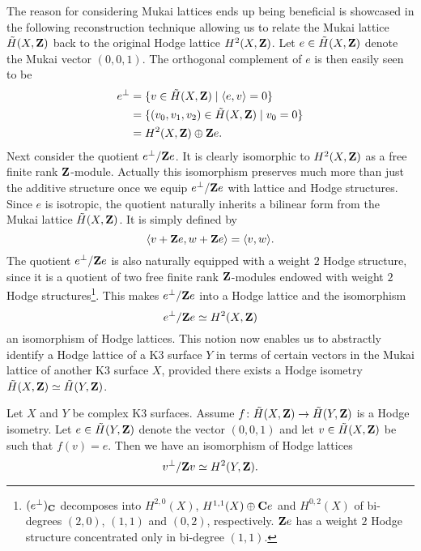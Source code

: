 The reason for considering Mukai lattices ends up being beneficial is showcased in the following reconstruction technique allowing us to relate the Mukai lattice $\,\tilde{\!{H}}(X, \mathbf Z)$ back to the original Hodge lattice $H^{2}(X, \mathbf Z)$.
Let $e \in \,\tilde{\!{H}}(X, \mathbf Z)$ denote the Mukai vector $(0,0,1)$.
The orthogonal complement of $e$ is then easily seen to be
\begin{align*}
    e^\perp &= \{ v \in \,\tilde{\!{H}}(X, \mathbf Z) \mid \langle e, v \rangle = 0\} \\
    &= \{(v_0, v_1, v_2) \in \,\tilde{\!{H}}(X, \mathbf Z) \mid v_0 = 0\} \\
    &= H^{2}(X, \mathbf Z) \oplus \mathbf Z e.
\end{align*}
Next consider the quotient $e^\perp / \mathbf Z e$. It is clearly isomorphic to $H^{2}(X, \mathbf Z)$ as a free finite rank $\mathbf Z$-module. Actually this isomorphism preserves much more than just the additive structure once we equip ${e}^\perp / \mathbf Z{e}$ with lattice and Hodge structures. Since $e$ is isotropic, the quotient naturally inherits a bilinear form from the Mukai lattice $\,\tilde{\!{H}}(X, \mathbf Z)$. It is simply defined by
\[
    \langle v + \mathbf Z e, w + \mathbf Z e \rangle = \langle v, w \rangle.
\]
The quotient ${e}^\perp / \mathbf Z{e}$ is also naturally equipped with a weight $2$ Hodge structure, since it is a quotient of two free finite rank $\mathbf Z$-modules endowed with weight $2$ Hodge structures\footnote{
    $(e^\perp)_\mathbf C$ decomposes into $H^{2,0}(X)$, $H^{1,1}(X) \oplus \mathbf C e$ and $H^{0,2}(X)$ of bi-degrees $(2,0)$, $(1,1)$ and $(0,2)$, respectively. $\mathbf Z e$ has a weight $2$ Hodge structure concentrated only in bi-degree $(1,1)$.
}. This makes ${e}^\perp / \mathbf Z{e}$ into a Hodge lattice and the isomorphism
\[
    {e}^\perp / \mathbf Z{e} \simeq H^{2}(X, \mathbf Z)
\]
an isomorphism of Hodge lattices. This notion now enables us to abstractly identify a Hodge lattice of a K3 surface $Y$ in terms of certain vectors in the Mukai lattice of another K3 surface $X$, provided there exists a Hodge isometry $\,\tilde{\!{H}}(X, \mathbf Z) \simeq \,\tilde{\!{H}}(Y, \mathbf Z)$.  
\begin{proposition}
    \label{Hodge lattice described by v}
    Let $X$ and $Y$ be complex K3 surfaces. Assume $f \colon \,\tilde{\!{H}}(X, \mathbf Z) \to \,\tilde{\!{H}}(Y, \mathbf Z)$ is a Hodge isometry. Let $e \in \,\tilde{\!{H}}(Y, \mathbf Z)$ denote the vector $(0,0,1)$ and let $v \in \,\tilde{\!{H}}(X, \mathbf Z)$ be such that $f(v) = e$. Then we have an isomorphism of Hodge lattices
    \[
        {v}^\perp / \mathbf Z{v} \simeq H^{2}(Y, \mathbf Z).
    \]
\end{proposition}

